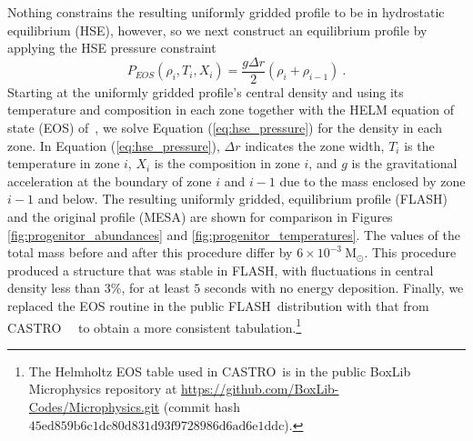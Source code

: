 \documentclass[iop,apj]{emulateapj}
\newcommand{\eqqref}[1]{Equation (\ref{#1})}
\newcommand{\code}[1]{\textsc{#1}}
\newcommand{\FLASH}{\code{FLASH}}
\newcommand{\CASTRO}{\code{CASTRO}}
\newcommand{\MESA}{\code{MESA}}
\begin{document}
Nothing constrains the resulting uniformly gridded profile to be in
hydrostatic equilibrium (HSE), however, so we next construct an
equilibrium profile by applying the HSE pressure
constraint
\begin{equation}\label{eq:hse_pressure}
  P_{EOS}(\rho_i,T_i,X_i) = \frac{g \Delta r}{2} (\rho_i +
  \rho_{i-1})\ .
\end{equation}
Starting at the uniformly gridded profile's central density and using
its temperature and composition in each zone together with the HELM
equation of state (EOS) of~\citet{castro1}, we solve
\eqqref{eq:hse_pressure} for the density in each zone. In
\eqqref{eq:hse_pressure}, $\Delta r$ indicates the zone width, $T_i$
is the temperature in zone $i$, $X_i$ is the composition in zone $i$,
and $g$ is the gravitational acceleration at the boundary of zone $i$
and $i-1$ due to the mass enclosed by zone $i-1$ and below. The
resulting uniformly gridded, equilibrium profile (\FLASH) and the
original profile (\MESA) are shown for comparison in Figures
\ref{fig:progenitor_abundances} and \ref{fig:progenitor_temperatures}.
The values of the total mass before and after this procedure differ by
$6 \times 10^{-3}\ \mathrm{M_\odot}$.  This procedure produced a
structure that was stable in \FLASH, with fluctuations in central
density less than $3\%$, for at least $5$ seconds with no energy
deposition. Finally, we replaced the EOS routine in the public
\FLASH\ distribution with that from
\CASTRO\ ~\citep{timmes.swesty:accuracy,castro1} to obtain a more
consistent tabulation.\footnote{The Helmholtz EOS table used in
  \CASTRO\ is in the public BoxLib Microphysics repository at
  \url{https://github.com/BoxLib-Codes/Microphysics.git} (commit hash
  $\mathrm{45ed859b6c1dc80d831d93f9728986d6ad6e1ddc}$).}

\end{document}
